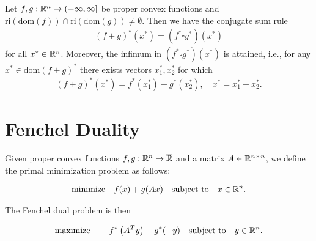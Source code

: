 \begin{theorem}
  Let
  $
    f,g:
    \mathbb{R}^n \to (-\infty, \infty]
  $
  be proper convex functions 
  and
  $
  \text{ri}\left( \text{dom}(f) \right)
  \cap
  \text{ri}\left( \text{dom}(g) \right)
  \neq 
  \emptyset
  .
  $
  Then we have the conjugate sum rule
  \begin{gather}
    ( f + g )^*(x^*)
    =
    ( f^* \square g^*)(x^*)
  \end{gather}
  for all $x^* \in \mathbb{R}^n$.
  Moreover, the infimum in 
  $
    ( f^* \square g^*)(x^*)
  $
  is attained, i.e., for any
  $
    x^* \in \text{dom}(f+g)^*
  $
  there exists vectors $x_1^*, x_2^*$
  for which
  \begin{gather}
    (f+g)^*(x^*)
    =
    f^*(x_1^*)
    +
    g^*(x_2^*),
    \quad
    x^* = x_1^* + x_2^*.
  \end{gather}
\end{theorem}


\section{Fenchel Duality}


Given 
proper convex functions $f, g : \mathbb{R}^n \to \overline{\mathbb{R}}$ 
and
a matrix $A \in \mathbb{R}^{n \times n}$,
we define 
the primal minimization problem as follows:

\begin{gather}
  \label{cvxa_primal_problem}
  \text{minimize}
  \quad
  f(x) + g(Ax) 
  \quad
  \text{subject to}
  \quad
  x \in \mathbb{R}^n.
\end{gather}

The Fenchel dual problem is then

\begin{gather}
  \label{cvxa_dual_problem}
  \text{maximize}
  \quad
  -f^* \left( A^T y \right) - g^*(-y) 
  \quad
  \text{subject to}
  \quad
  y \in \mathbb{R}^n.
\end{gather}

